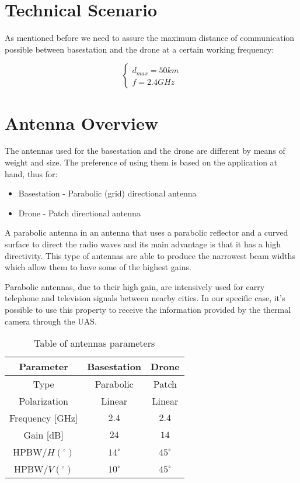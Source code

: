 \section*{Technical Scenario}
As mentioned before we need to assure the maximum distance of communication possible between basestation and the drone at a certain working frequency:

\begin{equation*}\label{eq:tech_parameters1} 
 	\begin{cases}
 		d_{max} = 50 km	\\
 		f = 2.4 GHz
 	\end{cases}
\end{equation*}

\section*{Antenna Overview}
The antennas used for the basestation and the drone are different by means of weight and size. The preference of using them is based on the application at hand, thus for:
\begin{itemize}
	\item Basestation - Parabolic (grid) directional antenna 
	\item Drone - Patch directional antenna
\end{itemize}

A parabolic antenna in an antenna that uses a parabolic reflector and a curved surface to direct the radio waves and its main advantage is that it has a high directivity. This type of antennas are able to produce the narrowest beam widths which allow them to have some of the highest gains.

Parabolic antennas, due to their high gain, are intensively used for carry telephone and television signals between nearby cities. In our specific case, it’s possible to use this property to receive the information provided by the thermal camera through the UAS.

\begin{table}[h!]
\centering
	\begin{tabular}{|c||c|c|}
		\hline
		Parameter & Basestation & Drone\\ \hline\hline
		Type & Parabolic & Patch\\ \hline
		Polarization & Linear & Linear\\ \hline
		Frequency [GHz] & $2.4$ & $2.4$\\ \hline
		Gain [dB] & $24$ & $14$\\ \hline
		HPBW/$H(^{\circ})$ & $14^{\circ}$ & $45^{\circ}$\\ \hline
		HPBW/$V(^{\circ})$ & $10^{\circ}$ & $45^{\circ}$\\ \hline
	\end{tabular}
	\caption{Table of antennas parameters}
	\label{table:1}
\end{table}

